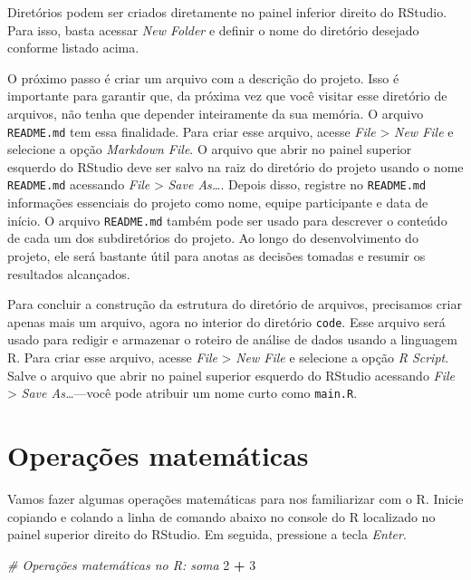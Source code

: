 \documentclass[
]{book}
\newenvironment{Shaded}{\begin{snugshade}}{\end{snugshade}}
\newcommand{\CommentTok}[1]{\textcolor[rgb]{0.56,0.35,0.01}{\textit{#1}}}
\newcommand{\DecValTok}[1]{\textcolor[rgb]{0.00,0.00,0.81}{#1}}
\newcommand{\OperatorTok}[1]{\textcolor[rgb]{0.81,0.36,0.00}{\textbf{#1}}}
\newcommand{\StringTok}[1]{\textcolor[rgb]{0.31,0.60,0.02}{#1}}
\begin{document}
Diretórios podem ser criados diretamente no painel inferior direito do RStudio. Para isso, basta acessar \emph{New Folder} e definir o nome do diretório desejado conforme listado acima.

O próximo passo é criar um arquivo com a descrição do projeto. Isso é importante para garantir que, da próxima vez que você visitar esse diretório de arquivos, não tenha que depender inteiramente da sua memória. O arquivo \texttt{README.md} tem essa finalidade. Para criar esse arquivo, acesse \emph{File} \textgreater{} \emph{New File} e selecione a opção \emph{Markdown File}. O arquivo que abrir no painel superior esquerdo do RStudio deve ser salvo na raiz do diretório do projeto usando o nome \texttt{README.md} acessando \emph{File} \textgreater{} \emph{Save As\ldots{}}. Depois disso, registre no \texttt{README.md} informações essenciais do projeto como nome, equipe participante e data de início. O arquivo \texttt{README.md} também pode ser usado para descrever o conteúdo de cada um dos subdiretórios do projeto. Ao longo do desenvolvimento do projeto, ele será bastante útil para anotas as decisões tomadas e resumir os resultados alcançados.

Para concluir a construção da estrutura do diretório de arquivos, precisamos criar apenas mais um arquivo, agora no interior do diretório \texttt{code}. Esse arquivo será usado para redigir e armazenar o roteiro de análise de dados usando a linguagem R. Para criar esse arquivo, acesse \emph{File} \textgreater{} \emph{New File} e selecione a opção \emph{R Script}. Salve o arquivo que abrir no painel superior esquerdo do RStudio acessando \emph{File} \textgreater{} \emph{Save As\ldots{}}---você pode atribuir um nome curto como \texttt{main.R}.

\hypertarget{operauxe7uxf5es-matemuxe1ticas}{%
\chapter{Operações matemáticas}\label{operauxe7uxf5es-matemuxe1ticas}}

Vamos fazer algumas operações matemáticas para nos familiarizar com o R. Inicie copiando e colando a linha de comando abaixo no console do R localizado no painel superior direito do RStudio. Em seguida, pressione a tecla \emph{Enter}.

\begin{Shaded}
\begin{Highlighting}[]
\CommentTok{# Operações matemáticas no R: soma}
\DecValTok{2} \OperatorTok{+}\StringTok{ }\DecValTok{3}
\end{Highlighting}
\end{Shaded}
\end{document}
